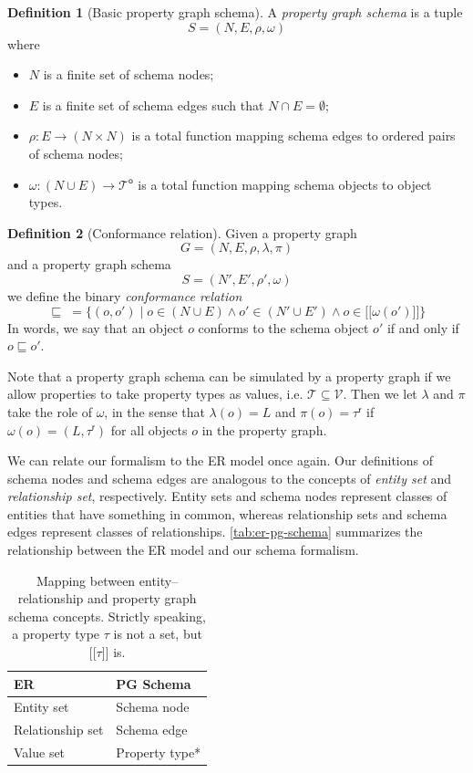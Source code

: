 \documentclass{article}
\theoremstyle{definition}
\newtheorem{definition}{Definition}
\newcommand{\ptype}{\tau}
\newcommand{\ptypes}{\mathcal{T}}
\newcommand{\rtype}{\tau^\mathsf{r}}
\newcommand{\otypes}{\mathcal{T}^\mathsf{o}}
\newcommand{\lsem}{\ensuremath{[\![}}
\newcommand{\rsem}{\ensuremath{]\!]}}
\newcommand{\sem}[1]{\ensuremath{\lsem #1 \rsem}}
\newcommand{\conf}{\sqsubseteq}
\begin{document}
\begin{definition}[Basic property graph schema]
  \label{def:pg-schema-basic}
  A \emph{property graph schema} is a tuple $$S = (N, E, \rho, \omega)$$ where
  \begin{itemize}
    \item $N$ is a finite set of schema nodes;
    \item $E$ is a finite set of schema edges such that $N \cap E = \emptyset$;
    \item $\rho : E \to (N \times N)$ is a total function mapping schema edges to ordered pairs of schema nodes;
    \item $\omega : (N \cup E) \to \otypes$ is a total function mapping schema objects to object types.
  \end{itemize}
\end{definition}

\begin{definition}[Conformance relation]
  Given a property graph $$G = (N, E, \rho, \lambda, \pi)$$ and a property graph schema $$S = (N', E', \rho', \omega)$$ we define the binary \emph{conformance relation} $$\conf \; = \{(o, o') \mid o \in (N \cup E) \wedge o' \in (N' \cup E') \wedge o \in \sem{\omega(o')}\}$$ In words, we say that an object $o$ conforms to the schema object $o'$ if and only if $o \conf o'$.
\end{definition}

Note that a property graph schema can be simulated by a property graph if we allow properties to take property types as values, i.e. $\ptypes \subseteq \mathcal{V}$. Then we let $\lambda$ and $\pi$ take the role of $\omega$, in the sense that $\lambda(o) = L$ and $\pi(o) = \rtype$ if $\omega(o) = (L, \rtype)$ for all objects $o$ in the property graph.

We can relate our formalism to the ER model once again. Our definitions of schema nodes and schema edges are analogous to the concepts of \emph{entity set} and \emph{relationship set}, respectively. Entity sets and schema nodes represent classes of entities that have something in common, whereas relationship sets and schema edges represent classes of relationships. \autoref{tab:er-pg-schema} summarizes the relationship between the ER model and our schema formalism.

\begin{table}[t]
  \centering
  \begin{tabular}{|l|l|}
    \hline
    \textbf{ER}      & \textbf{PG Schema} \\
    \hline
    Entity set       & Schema node        \\
    Relationship set & Schema edge        \\
    Value set        & Property type*     \\
    \hline
  \end{tabular}
  \caption{Mapping between entity--relationship and property graph schema concepts. Strictly speaking, a property type $\ptype$ is not a set, but $\sem{\ptype}$ is.}
  \label{tab:er-pg-schema}
\end{table}
\end{document}
